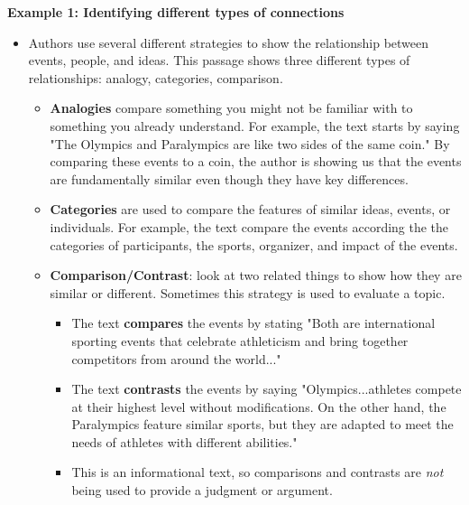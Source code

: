 \documentclass[12pt]{article}
\begin{document}
\begin{tcolorbox}[colframe=black!60, colback=white, 
coltitle=black, colbacktitle=black!15, fonttitle=\bfseries\Large, 
title=Examples, halign title=center, left=10pt, right=10pt, top=10pt, bottom=15pt]

\textbf{Example 1: Identifying different types of connections}
\begin{itemize}

    \item Authors use several different strategies to show the relationship between events, people, and ideas. This passage shows three different types of relationships: analogy, categories, comparison.
    \begin{itemize}
        \item \textbf{Analogies} compare something you might not be familiar with to something you already understand. For example, the text starts by saying "The Olympics and Paralympics are like two sides of the same coin." By comparing these events to a coin, the author is showing us that the events are fundamentally similar even though they have key differences.
        \item \textbf{Categories} are used to compare the features of similar ideas, events, or individuals. For example, the text compare the events according the the categories of participants, the sports, organizer, and impact of the events. 
        \item \textbf{Comparison/Contrast}: look at two related things to show how they are similar or different. Sometimes this strategy is used to evaluate a topic. 
        \begin{itemize}
            \item The text \textbf{compares} the events by stating "Both are international sporting events that celebrate athleticism and bring together competitors from around the world..." 
            \item The text \textbf{contrasts} the events by saying "Olympics...athletes compete at their highest level without modifications. On the other hand, the Paralympics feature similar sports, but they are adapted to meet the needs of athletes with different abilities."
            \item This is an informational text, so comparisons and contrasts are \textit{not} being used to provide a judgment or argument.
        \end{itemize}
    \end{itemize}
    \end{itemize}
 
   


\end{tcolorbox}
\end{document}
